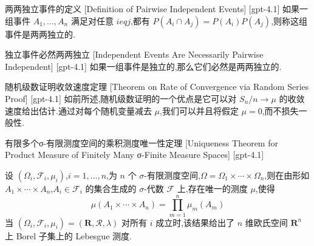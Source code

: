 \documentclass[UTF8]{ctexart}
\begin{document}
    
    
    \begin{dfn}
        {两两独立事件的定义}
        [Definition of Pairwise Independent Events]
        [gpt-4.1]
        如果一组事件 $A_1, \ldots, A_n$ 满足对任意 $i 
eq j$,都有 $P(A_i \cap A_j) = P(A_i) P(A_j)$,则称这组事件是两两独立的.
    \end{dfn}
    
    
    
    \begin{ppt}
        {独立事件必然两两独立}
        [Independent Events Are Necessarily Pairwise Independent]
        [gpt-4.1]
        如果一组事件是独立的,那么它们必然是两两独立的.
    \end{ppt}
    
    
    
    \begin{thm}
        {随机级数证明收敛速度定理}
        [Theorem on Rate of Convergence via Random Series Proof]
        [gpt-4.1]
        如前所述,随机级数证明的一个优点是它可以对 $S_{n} / n \to \mu$ 的收敛速度给出估计.通过对每个随机变量减去 $\mu$,我们可以并且将假定 $\mu = 0$,而不损失一般性.
    \end{thm}
    
    
    
    \begin{thm}
        {有限多个σ-有限测度空间的乘积测度唯一性定理}
        [Uniqueness Theorem for Product Measure of Finitely Many σ-Finite Measure Spaces]
        [gpt-4.1]
        
设 $(\Omega_{i}, \mathcal{F}_{i}, \mu_{i})$,$i = 1, \ldots, n$,为 $n$ 个 $\sigma$-有限测度空间,$\Omega = \Omega_{1} \times \cdots \times \Omega_{n}$,则在由形如 $A_{1} \times \cdots \times A_{n}$,$A_{i} \in \mathcal{F}_{i}$ 的集合生成的 $\sigma$-代数 $\mathcal{F}$ 上,存在唯一的测度 $\mu$,使得
\[
\mu(A_{1} \times \cdots \times A_{n}) = \prod_{m=1}^{n} \mu_{m}(A_{m})
\]
当 $(\Omega_{i}, \mathcal{F}_{i}, \mu_{i}) = (\mathbf{R}, \mathcal{R}, \lambda)$ 对所有 $i$ 成立时,该结果给出了 $n$ 维欧氏空间 $\mathbf{R}^{n}$ 上 Borel 子集上的 Lebesgue 测度.

    \end{thm}
    
    
    
\end{document}
